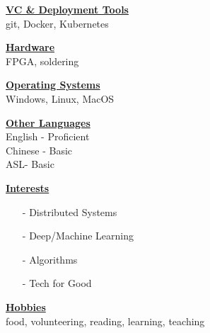 \documentclass{WeiAndrew}
\begin{document}
{\begin{minipage}[t][\textheight-2\fboxsep-2\fboxrule][t]{0.25\textwidth}
        \textbf{\underline{VC \& Deployment Tools}} \\
        git, Docker, Kubernetes
        \vspace{12px}

        \textbf{\underline{Hardware}} \\
        FPGA, soldering
        \vspace{12px}

        \textbf{\underline{Operating Systems}} \\
        Windows, Linux, MacOS
        \vspace{12px}

        \textbf{\underline{Other Languages}} \\
        English - Proficient \\
        Chinese - Basic      \\
        ASL\nobreakspace\nobreakspace\nobreakspace\nobreakspace\nobreakspace - Basic      \\
        \vspace{12px}

        \textbf{\underline{Interests}} \\
        \begin{itemize}[leftmargin=4mm]
            \item[-] Distributed Systems
            \item[-] Deep/Machine Learning
            \item[-] Algorithms
            \item[-] Tech for Good
        \end{itemize}
        \vspace{12px}

        \textbf{\underline{Hobbies}} \\
        food, volunteering, reading, learning, teaching
    \end{minipage}%
    \hspace{0.01\textwidth}
}%
\hspace{0.01\textwidth}
\end{document}
